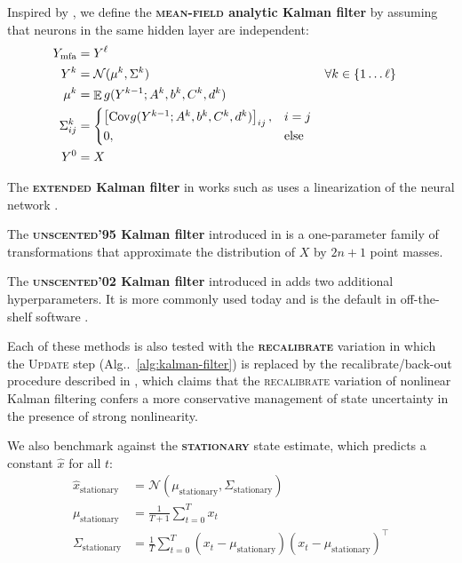 \documentclass{article} %
\DeclareMathOperator{\expect}{\mathbb{E}}
\begin{document}
Inspired by \citet{huber_bayesian_2020, wagner_kalman_2022,akgul_deterministic_2025}, we define the \textbf{\textsc{mean-field} analytic Kalman filter} by assuming that neurons in the same hidden layer are independent:
\begin{align*}
  Y_\mathrm{mfa} &=  Y^\ell\\
  Y^k &= \mathcal N(\mu^k, \Sigma^k) & \forall k &\in \cbr{1 \ldots \ell} \\
  \mu^k &= \expect g(Y^{k-1}; A^k, b^k, C^k, d^k)
  \\
  \Sigma^k_{ij} &= \begin{cases}
    \sbr{\Cov g(Y^{k-1}; A^k, b^k, C^k, d^k)}_{ij}, & i=j
    \\
    0, &\text{else}
  \end{cases}
  \\
  Y^0 &= X
\end{align*}

The \textbf{\textsc{extended} Kalman filter} in works such as \citet{jiang_new_2025,oveissi_novel_2025} uses a linearization of the neural network
\citep{titensky_uncertainty_2018, nagel_kalman-bucy-informed_2022,petersen_uncertainty_2024, jungmann_analytical_2025}.

The \textbf{\textsc{unscented'95} Kalman filter} introduced in \citep{julier_new_1995,julier_new_1997,julier_new_2000} is a one-parameter family of transformations that approximate the distribution of \(X\) by \(2n +1\) point masses.

The \textbf{\textsc{unscented'02} Kalman filter} introduced in \citep{julier_scaled_2002,wan_unscented_2000} adds two additional hyperparameters.
It is more commonly used today \citep{jiang_new_2025,anurag_rcukf_2025} and is the default in off-the-shelf software \citep{ljung_unscentedkalmanfilter_2025}.

Each of these methods is also tested with the \textbf{\textsc{recalibrate}} variation in which the \textsc{Update} step (Alg..~\ref{alg:kalman-filter}) is replaced by the recalibrate/back-out procedure described in \citet[Alg.~1]{jiang_new_2025}, which claims that the \textsc{recalibrate} variation of nonlinear Kalman filtering confers a more conservative management of state uncertainty in the presence of strong nonlinearity.

We also benchmark against the \textbf{\textsc{stationary}} state estimate, which predicts a constant \(\hat x\) for all \(t\):
\begin{subequations}
\begin{align}
  \hat x_{\mathrm{stationary}} &= \mathcal N(\mu_{\mathrm{stationary}}, \Sigma_{\mathrm{stationary}})
  \\
  \mu_{\mathrm{stationary}} &= \frac{1}{T+1} \sum_{t = 0}^T x_t
  \\
  \Sigma_{\mathrm{stationary}} &= \frac{1}{T} \sum_{t = 0}^T (x_t - \mu_{\mathrm{stationary}})(x_t - \mu_{\mathrm{stationary}})^\intercal
\end{align}
\end{subequations}
\end{document}
